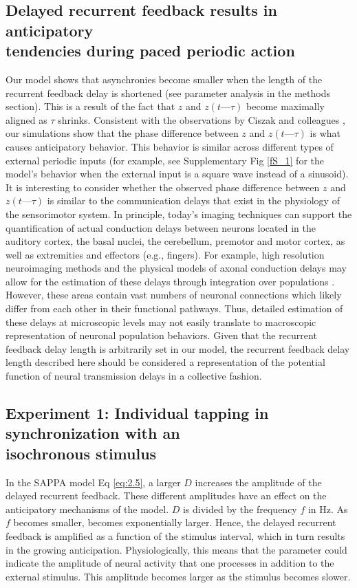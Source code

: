 \documentclass{report}
\begin{document}
\subsection{Delayed recurrent feedback results in anticipatory \\ tendencies during paced periodic action}

Our model shows that asynchronies become smaller when the length of the recurrent feedback delay is shortened (see parameter analysis in the methods section). This is a result of the fact that $z$ and $z(t—\tau)$ become maximally aligned as $\tau$ shrinks. Consistent with the observations by Ciszak and colleagues \cite{}, our simulations show that the phase difference between $z$ and $z(t—\tau)$ is what causes anticipatory behavior. This behavior is similar across different types of external periodic inputs (for example, see Supplementary Fig \ref{fS_1} for the model’s behavior when the external input is a square wave instead of a sinusoid). It is interesting to consider whether the observed phase difference between $z$ and $z(t—\tau)$ is similar to the communication delays that exist in the physiology of the sensorimotor system. In principle, today's imaging techniques can support the quantification of actual conduction delays between neurons located in the auditory cortex, the basal nuclei, the cerebellum, premotor and motor cortex, as well as extremities and effectors (e.g., fingers). For example, high resolution neuroimaging methods and the physical models of axonal conduction delays may allow for the estimation of these delays through integration over populations \cite{swadlow2012axonal}. However, these areas contain vast numbers of neuronal connections which likely differ from each other in their functional pathways. Thus, detailed estimation of these delays at microscopic levels may not easily translate to macroscopic representation of neuronal population behaviors. Given that the recurrent feedback delay length is arbitrarily set in our model, the recurrent feedback delay length described here should be considered a representation of the potential function of neural transmission delays in a collective fashion.

\subsection{Experiment 1: Individual tapping in synchronization with an \\ isochronous stimulus}

In the SAPPA model Eq \eqref{eq:2.5}, a larger $D$ increases the amplitude of the delayed recurrent feedback. These different amplitudes have an effect on the anticipatory mechanisms of the model. $D$ is divided by the frequency $f$ in Hz. As $f$ becomes smaller, becomes exponentially larger. Hence, the delayed recurrent feedback is amplified as a function of the stimulus interval, which in turn results in the growing anticipation. Physiologically, this means that the parameter could indicate the amplitude of neural activity that one processes in addition to the external stimulus. This amplitude becomes larger as the stimulus becomes slower.
\end{document}
